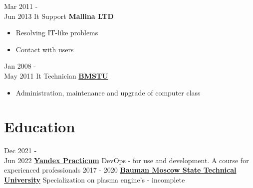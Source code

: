 \documentclass[letterpaper]{twentysecondcv} %
\begin{document}
\begin{twenty}
    \twentyitem
        {Mar 2011 - \\ Jun 2013}
        {It Support }
        {\textbf{Mallina LTD}}
        {}
        {
            \begin{itemize}
                \item Resolving IT-like problems
                \item Contact with users
            \end{itemize}
        }
    \twentyitem
        {Jan 2008 - \\ May 2011}
        {It Technician}
        {\href{https://www.bmstu.ru/}{\textbf{BMSTU}}}
        {}
        {
            \begin{itemize}
                \item Administration, maintenance and upgrade of computer class
            \end{itemize}
        }
\end{twenty}


\section{Education}

\begin{twenty} %
	\twentyitem
    	{Dec 2021 -\\ Jun 2022}
        {}
        {}
        {\href{https://practicum.yandex.ru/promo/devops-course}{\textbf{Yandex Practicum}}}
        {DevOps - for use and development. A course for experienced professionals}
	\twentyitem
    	{2017 - 2020}
        {}
        {}
        {\href{https://www.bmstu.ru/}{\textbf{Bauman Moscow State Technical University}}}
        {Specialization on plasma engine's - incomplete}
\end{twenty}


\end{document}
